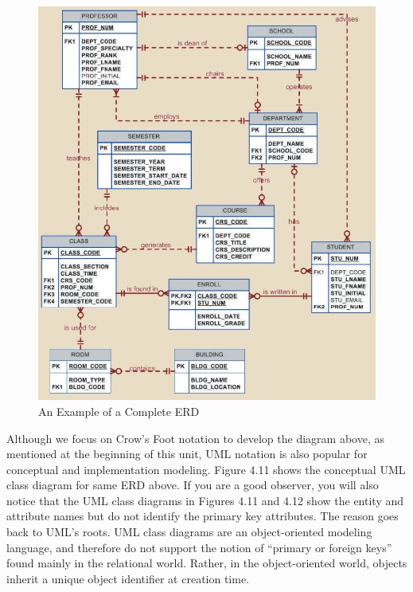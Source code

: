 \documentclass[a4paper, 12pt, titlepage]{report}
\begin{document}
{\begin{figure}[H]
\includegraphics[scale=0.6]{ERDComp}
\caption{An Example of a Complete ERD}
\end{figure}

\noindent Although we focus on Crow’s Foot notation to develop the diagram above, as mentioned at the beginning of this unit, UML notation is also popular for conceptual and
implementation modeling. Figure 4.11 shows the conceptual UML class diagram for same ERD above. If you are a good observer, you will also notice that the UML class diagrams in Figures 4.11 and 4.12 show the entity and attribute names but do not identify the primary key attributes. The reason goes back to UML’s roots. UML class diagrams are an object-oriented modeling language, and therefore do not support the notion of “primary or foreign keys” found mainly in the relational world. Rather, in the object-oriented world, objects inherit a unique object identifier at creation time.

}
\end{document}
